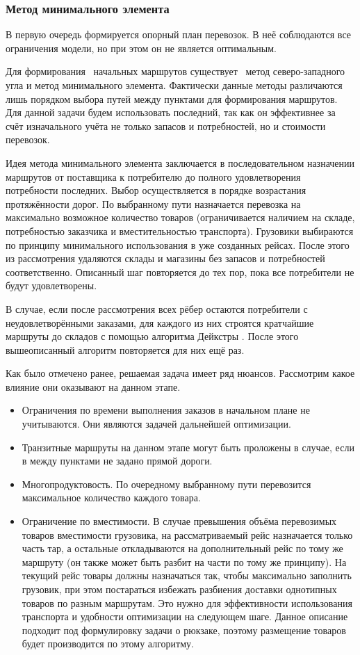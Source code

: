 	\subsubsection{Метод минимального элемента}
	В первую очередь формируется опорный план перевозок. В неё соблюдаются все ограничения модели, но при этом он не является оптимальным.
	
	Для формирования \, начальных маршрутов существует \, метод северо-западного угла и метод минимального элемента\cite{trans:comporation}. Фактически данные методы различаются лишь порядком выбора путей между пунктами для формирования маршрутов. Для данной задачи будем использовать последний, так как он эффективнее \cite{potential:polyindex} за счёт изначального учёта не только запасов и потребностей, но и стоимости перевозок.
	
	Идея метода минимального элемента заключается в последовательном назначении маршрутов от поставщика к потребителю до полного удовлетворения потребности последних. Выбор осуществляется в порядке возрастания протяжённости дорог. По выбранному пути назначается перевозка на максимально возможное количество товаров (ограничивается наличием на складе, потребностью заказчика и вместительностью транспорта). Грузовики выбираются по принципу минимального использования в уже созданных рейсах. После этого из рассмотрения удаляются склады и магазины без запасов и потребностей соответственно. Описанный шаг повторяется до тех пор, пока все потребители не будут удовлетворены.
	
	В случае, если после рассмотрения всех рёбер остаются потребители с неудовлетворёнными заказами, для каждого из них строятся кратчайшие маршруты до складов с помощью алгоритма Дейкстры \cite{alg:Corman}. После этого вышеописанный алгоритм повторяется для них ещё раз.
	
	Как было отмечено ранее, решаемая задача имеет ряд нюансов. Рассмотрим какое влияние они оказывают на данном этапе.
	\begin{itemize}
		\item Ограничения по времени выполнения заказов в начальном плане не учитываются. Они являются задачей дальнейшей оптимизации.
		\item Транзитные маршруты на данном этапе могут быть проложены в случае, если в между пунктами не задано прямой дороги.
		\item Многопродуктовость\cite{trans:polyprod}. По очередному выбранному пути перевозится максимальное количество каждого товара. 
		\item Ограничение по вместимости. В случае превышения объёма перевозимых товаров вместимости грузовика, на рассматриваемый рейс назначается только часть тар, а остальные откладываются на дополнительный рейс по тому же маршруту (он также может быть разбит на части по тому же принципу). На текущий рейс товары должны назначаться так, чтобы максимально заполнить грузовик, при этом постараться избежать разбиения доставки однотипных товаров по разным маршрутам. Это нужно для эффективности использования транспорта и удобности оптимизации на следующем шаге. Данное описание подходит под формулировку задачи о рюкзаке\cite{alg:Skiena}, поэтому размещение товаров будет производится по этому алгоритму.
	\end{itemize}
	
